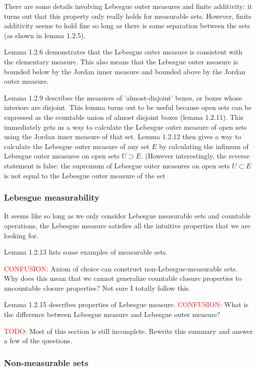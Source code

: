 \documentclass[answers,12pt]{exam}
\begin{document}
There are some details involving Lebesgue outer measures and finite additivity:
it turns out that this property only really holds for measurable sets.
However, finite additivity seems to hold fine so long as there is some separation between the sets (as shown in lemma 1.2.5).

Lemma 1.2.6 demonstrates that the Lebesgue outer measure is consistent with the elementary measure.
This also means that the Lebesgue outer measure is bounded below by the Jordan inner measure and bounded above by the Jordan outer measure.

Lemma 1.2.9 describes the measures of 'almost-disjoint' boxes, or boxes whose interiors are disjoint.
This lemma turns out to be useful because open sets can be expressed as the countable union of almost disjoint boxes (lemma 1.2.11).
This immediately gets us a way to calculate the Lebesgue outer measure of open sets using the Jordan inner measure of that set.
Lemma 1.2.12 then gives a way to calculate the Lebesgue outer measure of any set $E$ by calculating the infimum of Lebesgue outer measures on open sets $U \supset E$.
(However interestingly, the reverse statement is false: the supremum of Lebesgue outer measures on open sets $U \subset E$ is not equal to the Lebesgue outer measure of the set

\subsubsection{Lebesgue measurability}
It seems like so long as we only consider Lebesgue measurable sets and countable operations, the Lebesgue measure satisfies all the intuitive properties that we are looking for.

Lemma 1.2.13 lists some examples of measurable sets.

\textcolor{red}{CONFUSION}: Axiom of choice can construct non-Lebesgue-measurable sets.
Why does this mean that we cannot generalize countable closure properties to uncountable closure properties?
Not sure I totally follow this.

Lemma 1.2.15 describes properties of Lebesgue measure.
\textcolor{red}{CONFUSION}: What is the difference between Lebesgue measure and Lebesgue outer measure?

\textcolor{red}{TODO}: Most of this section is still incomplete.
Rewrite this summary and answer a few of the questions. 

\subsubsection{Non-measurable sets}
\end{document}
